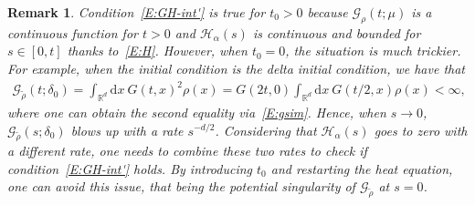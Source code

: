 \documentclass[sn-mathphys]{sn-jnl}%
\renewcommand{\R}{\mathbb{R}}
\newcommand{\ud}{\ensuremath{\mathrm{d}}}
\numberwithin{equation}{section}
\theoremstyle{thmstyleone}%
\theoremstyle{thmstyletwo}%
\newtheorem{remark}{Remark}[section]%
\theoremstyle{thmstylethree}%
\begin{document}
\begin{remark}
  Condition~\eqref{E:GH-int'} is true for $t_0>0$ because $\mathcal{G}_\rho(t;\mu)$ is a continuous
  function for $t>0$ and $\mathcal{H}_\alpha(s)$ is continuous and bounded for $s\in [0,t]$ thanks
  to~\eqref{E:H}. However, when $t_0 = 0$, the situation is much trickier. For example, when the
  initial condition is the delta initial condition, we have that
  \begin{align*}
    \mathcal{G}_{\tilde{\rho}}(t;\delta_0)
    = \int_{\R^d}\ud x\: G(t,x)^2 \rho(x)
    = G(2t,0) \int_{\R^d}\ud x\: G(t/2,x)\rho(x)
    < \infty,
  \end{align*}
  where one can obtain the second equality via~\eqref{E:gsim}. Hence, when $s\to 0$,
  $\mathcal{G}_{\tilde{\rho}}(s;\delta_0)$ blows up with a rate $s^{-d/2}$. Considering that
  $\mathcal{H}_\alpha(s)$ goes to zero with a different rate, one needs to combine these two rates
  to check if condition~\eqref{E:GH-int'} holds. By introducing $t_0$ and restarting the heat
  equation, one can avoid this issue, that being the potential singularity of
  $\mathcal{G}_{\tilde{\rho}}$ at $s = 0$.
\end{remark}
\end{document}
